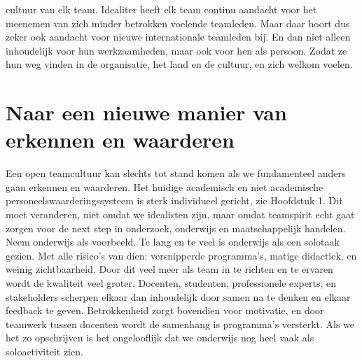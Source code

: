 \documentclass[smallauthor, chapterhaspagenum, nochapterinheader, pagenuminheader,  bigchapnum,medium2, tocpages, garamond, titleinheader]{jote-book}
\begin{document}
cultuur van elk team. Idealiter heeft elk team continu aandacht voor het meenemen van zich minder betrokken voelende teamleden. Maar daar hoort dus zeker ook aandacht voor nieuwe internationale teamleden bij. En dan niet alleen inhoudelijk voor hun werkzaamheden, maar ook voor hen als persoon. Zodat ze hun weg vinden in de organisatie, het land en de cultuur, en zich welkom voelen.



	\section{Naar een nieuwe manier van erkennen en waarderen}

	\enlargethispage{-\baselineskip}\checkandfixthelayout

	Een open teamcultuur kan slechts tot stand komen als we fundamenteel anders gaan erkennen en waarderen. Het huidige academisch en niet academische personeelswaarderingssysteem is sterk individueel gericht, zie Hoofdstuk 1. Dit moet veranderen, niet omdat we idealisten zijn, maar omdat teamspirit echt gaat zorgen voor de next step in onderzoek, onderwijs en maatschappelijk handelen. Neem onderwijs als voorbeeld. Te lang en te veel is onderwijs als een solotaak gezien. Met alle risico's van dien: versnipperde programma's, matige didactiek, en weinig zichtbaarheid. Door dit veel meer als team in te richten en te ervaren wordt de kwaliteit veel groter. Docenten, studenten, professionele experts, en stakeholders scherpen elkaar dan inhoudelijk door samen na te denken en elkaar feedback te geven. Betrokkenheid zorgt bovendien voor motivatie, en door teamwerk tussen docenten wordt de samenhang is programma's versterkt. Als we het zo opschrijven is het ongelooflijk dat we onderwijs nog heel vaak als soloactiviteit zien.
\end{document}
